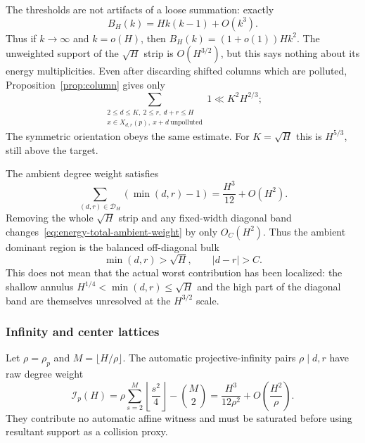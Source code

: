 The thresholds are not artifacts of a loose summation: exactly
\[
 B_H(k)=Hk(k-1)+O(k^3).
\]
Thus if $k\to\infty$ and $k=o(H)$, then
$B_H(k)=(1+o(1))Hk^2$.  The unweighted support of the
$\sqrt H$ strip is $O(H^{3/2})$, but this says nothing about its energy
multiplicities.  Even after discarding shifted columns which are
polluted, Proposition~\ref{prop:column} gives only
\begin{equation}\label{eq:energy-unpolluted-shallow}
 \sum_{\substack{2\leq d\leq K,\ 2\leq r,\ d+r\leq H\\
                  x\in X_{d,r}(p),\ x+d\ {\mathrm{unpolluted}}}}1
 \ll K^2H^{2/3};
\end{equation}
The symmetric orientation obeys the same estimate.  For $K=\sqrt H$
this is $H^{5/3}$, still above the target.

The ambient degree weight satisfies
\begin{equation}\label{eq:energy-total-ambient-weight}
 \sum_{(d,r)\in\mathscr D_H}(\min(d,r)-1)
 =\frac{H^3}{12}+O(H^2).
\end{equation}
Removing the whole $\sqrt H$ strip and any fixed-width diagonal band
changes~\eqref{eq:energy-total-ambient-weight} by only $O_C(H^2)$.
Thus the ambient dominant region is the balanced off-diagonal bulk
\[
 \min(d,r)>\sqrt H,\qquad |d-r|>C.
\]
This does not mean that the actual worst contribution has been localized:
the shallow annulus $H^{1/4}<\min(d,r)\leq\sqrt H$ and the high part of
the diagonal band are themselves unresolved at the $H^{3/2}$ scale.

\subsubsection{Infinity and center lattices}

\begin{proposition}
\label{prop:energy-infinity-weight}
Let $\rho=\rho_p$ and $M=\lfloor H/\rho\rfloor$.  The automatic
projective-infinity pairs $\rho\mid d,r$ have raw degree weight
\begin{equation}\label{eq:energy-infinity-weight}
 \mathcal I_p(H)
 =\rho\sum_{s=2}^{M}\left\lfloor\frac{s^2}{4}\right\rfloor
  -\binom M2
 =\frac{H^3}{12\rho^2}+O\left(\frac{H^2}{\rho}\right).
\end{equation}
They contribute no automatic affine witness and must be saturated before
using resultant support as a collision proxy.
\end{proposition}

